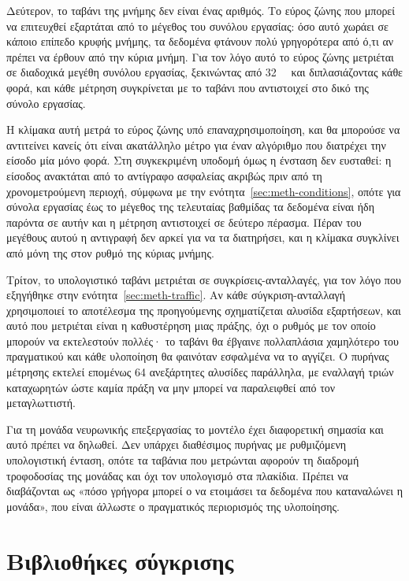 Δεύτερον, το ταβάνι της μνήμης δεν είναι ένας αριθμός. Το εύρος ζώνης που μπορεί
να επιτευχθεί εξαρτάται από το μέγεθος του συνόλου εργασίας: όσο αυτό χωράει σε
κάποιο επίπεδο κρυφής μνήμης, τα δεδομένα φτάνουν πολύ γρηγορότερα από ό,τι αν
πρέπει να έρθουν από την κύρια μνήμη. Για τον λόγο αυτό το εύρος ζώνης μετριέται
σε διαδοχικά μεγέθη συνόλου εργασίας, ξεκινώντας από \qty{32}{\kibi\byte} και
διπλασιάζοντας κάθε φορά, και κάθε μέτρηση συγκρίνεται με το ταβάνι που
αντιστοιχεί στο δικό της σύνολο εργασίας.

Η κλίμακα αυτή μετρά το εύρος ζώνης υπό επαναχρησιμοποίηση, και θα μπορούσε να
αντιτείνει κανείς ότι είναι ακατάλληλο μέτρο για έναν αλγόριθμο που διατρέχει την
είσοδο μία μόνο φορά. Στη συγκεκριμένη υποδομή όμως η ένσταση δεν ευσταθεί: η
είσοδος ανακτάται από το αντίγραφο ασφαλείας ακριβώς πριν από τη χρονομετρούμενη
περιοχή, σύμφωνα με την ενότητα~\ref{sec:meth-conditions}, οπότε για σύνολα
εργασίας έως το μέγεθος της τελευταίας βαθμίδας τα δεδομένα είναι ήδη παρόντα σε
αυτήν και η μέτρηση αντιστοιχεί σε δεύτερο πέρασμα. Πέραν του μεγέθους αυτού η
αντιγραφή δεν αρκεί για να τα διατηρήσει, και η κλίμακα συγκλίνει από μόνη της
στον ρυθμό της κύριας μνήμης.

Τρίτον, το υπολογιστικό ταβάνι μετριέται σε συγκρίσεις-ανταλλαγές, για τον λόγο
που εξηγήθηκε στην ενότητα~\ref{sec:meth-traffic}. Αν κάθε σύγκριση-ανταλλαγή
χρησιμοποιεί το αποτέλεσμα της προηγούμενης σχηματίζεται αλυσίδα εξαρτήσεων, και
αυτό που μετριέται είναι η καθυστέρηση μιας πράξης, όχι ο ρυθμός με τον οποίο
μπορούν να εκτελεστούν πολλές· το ταβάνι θα έβγαινε πολλαπλάσια χαμηλότερο του
πραγματικού και κάθε υλοποίηση θα φαινόταν εσφαλμένα να το αγγίζει. Ο πυρήνας
μέτρησης εκτελεί επομένως 64 ανεξάρτητες αλυσίδες παράλληλα, με εναλλαγή τριών
καταχωρητών ώστε καμία πράξη να μην μπορεί να παραλειφθεί από τον μεταγλωττιστή.

Για τη μονάδα νευρωνικής επεξεργασίας το μοντέλο έχει διαφορετική σημασία και
αυτό πρέπει να δηλωθεί. Δεν υπάρχει διαθέσιμος πυρήνας  με ρυθμιζόμενη
υπολογιστική ένταση, οπότε τα ταβάνια που μετρώνται αφορούν τη διαδρομή
τροφοδοσίας της μονάδας και όχι τον υπολογισμό στα πλακίδια. Πρέπει να
διαβάζονται ως «πόσο γρήγορα μπορεί ο  να ετοιμάσει τα δεδομένα που
καταναλώνει η μονάδα», που είναι άλλωστε ο πραγματικός περιορισμός της
υλοποίησης.

\section{Βιβλιοθήκες σύγκρισης}
\label{sec:meth-baseline-libraries}

